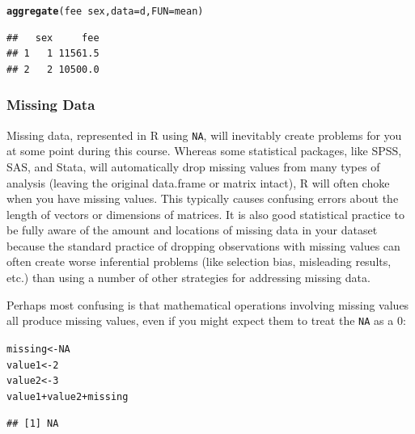 \documentclass[12pt]{article}\usepackage[]{graphicx}\usepackage[]{color}
\makeatletter
\newcommand{\hlnum}[1]{\textcolor[rgb]{0.686,0.059,0.569}{#1}}%
\newcommand{\hlopt}[1]{\textcolor[rgb]{0,0,0}{#1}}%
\newcommand{\hlstd}[1]{\textcolor[rgb]{0.345,0.345,0.345}{#1}}%
\newcommand{\hlkwb}[1]{\textcolor[rgb]{0.69,0.353,0.396}{#1}}%
\newcommand{\hlkwc}[1]{\textcolor[rgb]{0.333,0.667,0.333}{#1}}%
\newcommand{\hlkwd}[1]{\textcolor[rgb]{0.737,0.353,0.396}{\textbf{#1}}}%
\newenvironment{kframe}{%
 \def\at@end@of@kframe{}%
 \ifinner\ifhmode%
  \def\at@end@of@kframe{\end{minipage}}%
  \begin{minipage}{\columnwidth}%
 \fi\fi%
 \def\FrameCommand##1{\hskip\@totalleftmargin \hskip-\fboxsep
 \colorbox{shadecolor}{##1}\hskip-\fboxsep
     \hskip-\linewidth \hskip-\@totalleftmargin \hskip\columnwidth}%
 \MakeFramed {\advance\hsize-\width
   \@totalleftmargin\z@ \linewidth\hsize
   \@setminipage}}%
 {\par\unskip\endMakeFramed%
 \at@end@of@kframe}
\newenvironment{knitrout}{}{} %
\makeatother
\begin{document}
\begin{knitrout}
\color{fgcolor}\begin{kframe}
\begin{alltt}
\hlkwd{aggregate}\hlstd{(fee} \hlopt{~} \hlstd{sex,} \hlkwc{data} \hlstd{= d,} \hlkwc{FUN} \hlstd{= mean)}
\end{alltt}
\begin{verbatim}
##   sex     fee
## 1   1 11561.5
## 2   2 10500.0
\end{verbatim}
\end{kframe}
\end{knitrout}


\subsubsection{Missing Data}
Missing data, represented in R using \texttt{NA}, will inevitably create problems for you at some point during this course. Whereas some statistical packages, like SPSS, SAS, and Stata, will automatically drop missing values from many types of analysis (leaving the original data.frame or matrix intact), R will often choke when you have missing values. This typically causes confusing errors about the length of vectors or dimensions of matrices. It is also good statistical practice to be fully aware of the amount and locations of missing data in your dataset because the standard practice of dropping observations with missing values can often create worse inferential problems (like selection bias, misleading results, etc.) than using a number of other strategies for addressing missing data.

Perhaps most confusing is that mathematical operations involving missing values all produce missing values, even if you might expect them to treat the \texttt{NA} as a 0:

\begin{knitrout}
\color{fgcolor}\begin{kframe}
\begin{alltt}
\hlstd{missing} \hlkwb{<-} \hlnum{NA}
\hlstd{value1} \hlkwb{<-} \hlnum{2}
\hlstd{value2} \hlkwb{<-} \hlnum{3}
\hlstd{value1}\hlopt{+}\hlstd{value2}\hlopt{+}\hlstd{missing}
\end{alltt}
\begin{verbatim}
## [1] NA
\end{verbatim}
\end{kframe}
\end{knitrout}
\end{document}
